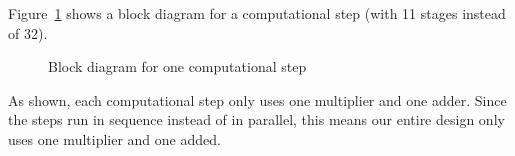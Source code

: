 Figure~\ref{fig:design:compstep} shows a block diagram for a computational step (with 11 stages instead of 32).

\begin{figure}[h]
	\centering
	\def\svgwidth{0.6\textwidth}
	
	\caption{Block diagram for one computational step}
	\label{fig:design:compstep}
\end{figure}

As shown, each computational step only uses one multiplier and one adder.
Since the steps run in sequence instead of in parallel, this means our entire design only uses one multiplier and one added.

\strengthfilter
